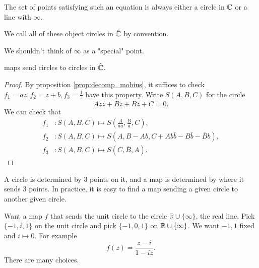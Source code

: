 \documentclass[10pt]{article}
\begin{document}
      \begin{exercise}
          The set of points satisfying such an equation is always either a circle in ${\mathbb{C}}$ or a line with $ \infty $.
      \end{exercise}

      We call all of these object circles in $ \hat{{\mathbb{C}}} $ by convention.
      \begin{remark}
          We shouldn't think of $\infty$ as a "special" point.
      \end{remark}

      \begin{theorem}\label{thm:6.8}
          \mobius maps send circles to circles in $ \hat{{\mathbb{C}}} $.
      \end{theorem}
      \begin{proof}
          By proposition \ref{prop:decomp_mobius}, it suffices to check $ f_1=az,f_2=z+b,f_3=\frac{1}{z} $ have this property. Write $S(A,B,C)$ for the circle 
          \[
             Az \bar{z}+ \overline{B}z+B \bar{z}+C=0. %
          \]
          We can check that 
          \begin{align*}
              f_1&: S(A,B,C)\mapsto S\left( \frac{A}{\bar{a}a},\frac{B}{\bar{a}},C \right),\\
              f_2&: S(A,B,C)\mapsto S(A,B-Ab,C+Ab \bar{b}-B \bar{b}- \overline{B}b),\\
              f_3&: S(A,B,C) \mapsto S(C,\overline{B},A).
          \end{align*}
      \end{proof}
      \begin{remark}
          A circle is determined by 3 points on it, and a \mobius map is determined by where it sends 3 points. In practice, it is easy to find a \mobius map sending a given circle to another given circle.
      \end{remark}
      \begin{example}
          Want a \mobius map $f$ that sends the unit circle to the circle $ \mathbb{R} \cup \{\infty\} $, the real line. Pick $ \{-1,i,1\} $ on the unit circle and pick $ \{-1,0,1\} $ on $ {\mathbb{R}} \cup \{\infty \} $. We want $-1,1$ fixed and $ i \mapsto 0 $. For example 
          \[
              f(z)=\frac{z-i}{1-iz}.
          \]
          There are many choices.
      \end{example}
\end{document}
